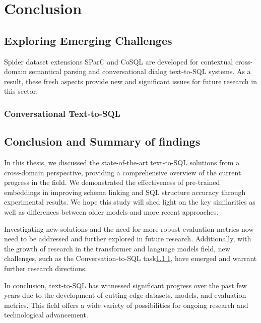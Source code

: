 \section{Conclusion}

\subsection{Exploring Emerging Challenges}

Spider dataset extensions SParC and CoSQL are developed for contextual cross-domain semantical parsing and conversational dialog text-to-SQL systems.
As a result, these fresh aspects provide new and significant issues for future research in this sector.

\subsubsection{Conversational Text-to-SQL} \label{sec:conv}





\subsection{Conclusion and Summary of findings}

In this thesis, we discussed the state-of-the-art text-to-SQL solutions from a cross-domain perspective, providing a comprehensive overview of the current progress in the field. We demonstrated the effectiveness of pre-trained embeddings in improving schema linking and SQL structure accuracy through experimental results. We hope this study will shed light on the key similarities as well as differences between older models and more recent approaches.

Investigating new solutions and the need for more robust evaluation metrics now need to be addressed and further explored in future research. Additionally, with the growth of research in the transformer and language models field, new challenges, such as the Conversation-to-SQL task\ref{sec:conv}, have emerged and warrant further research directions.

In conclusion, text-to-SQL has witnessed significant progress over the past few years due to the development of cutting-edge datasets, models, and evaluation metrics. This field offers a wide variety of possibilities for ongoing research and technological advancement.
